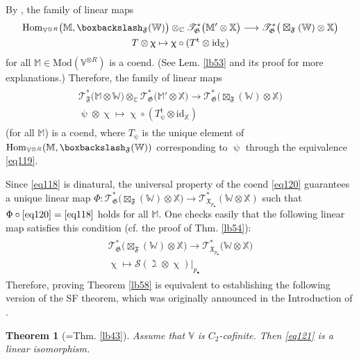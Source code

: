 \documentclass[11pt,b5paper,notitlepage]{article}
\theoremstyle{definition}
\theoremstyle{plain}
\newtheorem{thm}[df]{Theorem}
\newcommand{\tr}{\mathrm{t}} %
\newcommand{\Hom}{\mathrm{Hom}}
\newcommand{\blt}{\bullet}
\newcommand{\Vbb}{\mathbb V}
\newcommand{\Xbb}{\mathbb X}
\newcommand{\Wbb}{\mathbb W}
\newcommand{\Mbb}{\mathbb M}
\newcommand{\Cbb}{\mathbb C}
\newcommand{\<}{\left\langle}
\renewcommand{\>}{\right\rangle}
\newcommand{\fx}{\mathfrak{X}}
\newcommand{\ST}{\mathscr{T}}
\newcommand{\MS}{\mathcal{S}}
\newcommand{\bbs}{\boxbackslash}
\newcommand{\Mod}{\mathrm{Mod}}
\newcommand{\id}{\mathrm{id}}
\newcommand{\ff}{\mathfrak{F}}
\newcommand{\fg}{\mathfrak{G}}
\numberwithin{equation}{section}
\begin{document}
By \cite[Prop. 4]{FS-coends-CFT}, the family of linear maps
\begin{align*}
\begin{gathered}
\Hom_{\Vbb^{{\otimes R}}}\big(\Mbb,\bbs_\ff(\Wbb)\big)\otimes_\Cbb\ST^*_\fg\big(\Mbb'\otimes\Xbb\big)\longrightarrow \ST^*_\fg\big(\boxtimes_\ff(\Wbb)\otimes\Xbb\big)\\
T\otimes\upchi\mapsto \upchi\circ(T^\tr\otimes\id_\Xbb)
\end{gathered}
\end{align*}
for all $\Mbb\in\Mod(\Vbb^{\otimes R})$ is a coend. (See Lem. \ref{lb53} and its proof for more explanations.) Therefore, the family of linear maps
\begin{align}\label{eq120}
\begin{gathered}
\ST^*_\ff\big(\Mbb\otimes\Wbb\big)\otimes_\Cbb\ST^*_\fg\big(\Mbb'\otimes\Xbb\big)\longrightarrow\ST^*_\fg\big(\boxtimes_\ff(\Wbb)\otimes\Xbb\big)\\ \uppsi\otimes\upchi\mapsto \upchi\circ(T_\uppsi^\tr\otimes\id_\Xbb)
\end{gathered}
\end{align}
(for all $\Mbb$) is a coend, where $T_\uppsi$ is the unique element of $\Hom_{\Vbb^{\otimes R}}(\Mbb,\bbs_\ff(\Wbb))$ corresponding to $\uppsi$ through the equivalence \eqref{eq119}.


Since \eqref{eq118} is dinatural, the universal property of the coend \eqref{eq120} guarantees a unique linear map $\Phi:\ST^*_\fg\big(\boxtimes_\ff(\Wbb)\otimes\Xbb\big)\rightarrow\ST^*_{\fx_{p_\blt}}(\Wbb\otimes\Xbb)$ such that $\Phi\circ\eqref{eq120}=\eqref{eq118}$ holds for all $\Mbb$. One checks easily that the following linear map satisfies this condition (cf. the proof of Thm. \ref{lb54}):
\begin{align}\label{eq121}
\begin{gathered}
\ST_{\fg}^*\big(\boxtimes_\ff(\Wbb)\otimes \Xbb\big)\longrightarrow \ST_{\fx_{p_\blt}}^*\big(\Wbb\otimes \Xbb\big)\\
\upchi \mapsto \MS(\gimel\otimes \upchi)\big|_{p_\blt}
\end{gathered}
\end{align}
Therefore, proving Theorem \ref{lb58} is equivalent to establishing the following version of the SF theorem, which was originally announced in the Introduction of \cite{GZ1}.

\begin{thm}[=Thm. \ref{lb43}]\label{lb59}
Assume that $\Vbb$ is $C_2$-cofinite. Then \eqref{eq121} is a linear isomorphism.
\end{thm}
\end{document}
